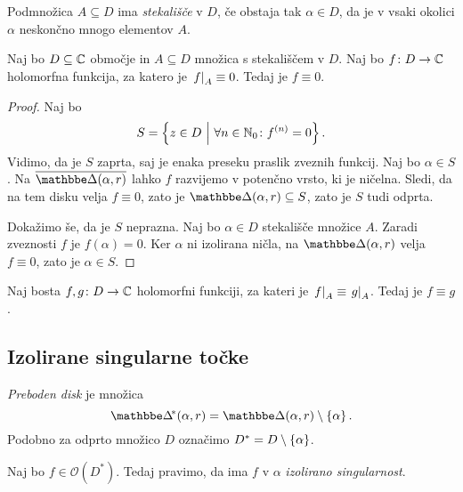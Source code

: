 \begin{definicija}
Podmnožica $A \subseteq D$ ima 
\emph{stekališče} v $D$, če obstaja tak
$\alpha \in D$, da je v vsaki okolici $\alpha$ neskončno mnogo
elementov $A$.
\end{definicija}


\begin{trditev}
Naj bo $D \subseteq \mathbb{C}$ območje in $A \subseteq D$ množica s
stekališčem v $D$. Naj bo $f \colon D \to \mathbb{C}$ holomorfna funkcija,
za katero je $\left. f\right|_{A}^{} \equiv 0$. Tedaj je $f \equiv 0$.
\end{trditev}

\begin{proof}
Naj bo
\[
S = \left\{z \in D~\middle\vert~\forall n \in \mathbb{N}_0 \colon f^{(n)} = 0\right\}.
\]
Vidimo, da je $S$ zaprta, saj je enaka preseku praslik zveznih
funkcij. Naj bo $\alpha \in S$. Na $\oline{\dsk(\alpha, r)}$ lahko
$f$ razvijemo v potenčno vrsto, ki je ničelna. Sledi, da na tem
disku velja $f \equiv 0$, zato je $\dsk(\alpha, r) \subseteq S$,
zato je $S$ tudi odprta.

Dokažimo še, da je $S$ neprazna. Naj bo $\alpha \in D$ stekališče
množice $A$. Zaradi zveznosti $f$ je $f(\alpha) = 0$. Ker $\alpha$
ni izolirana ničla, na $\dsk(\alpha, r)$ velja $f \equiv 0$, zato
je $\alpha \in S$.
\end{proof}

\begin{posledica}
Naj bosta $f, g \colon D \to \mathbb{C}$ holomorfni funkciji, za kateri je
$\left. f\right|_{A}^{} \equiv \left. g\right|_{A}^{}$. Tedaj je $f \equiv g$.
\end{posledica}

\newpage

\subsection{Izolirane singularne točke}

\begin{definicija}
\emph{Preboden disk} je množica
\[
\dskx(\alpha, r) = \dsk(\alpha, r) \setminus \set{\alpha}.
\]
Podobno za odprto množico $D$ označimo
$D^* = D \setminus \left\{\alpha\right\}$.
\end{definicija}

\begin{definicija}
Naj bo $f \in \mathcal{O}(D^*)$. Tedaj pravimo, da ima $f$ v
$\alpha$ \emph{izolirano singularnost}.
\end{definicija}

